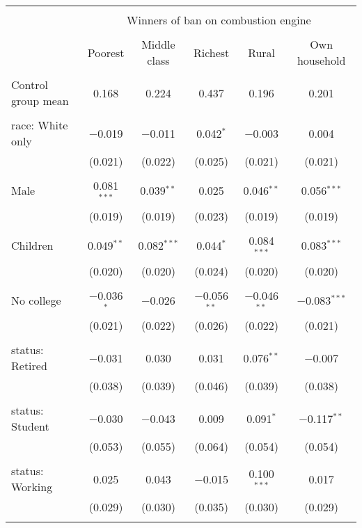 
\begin{tabular}{@{\extracolsep{5pt}}lccccc} 
\\[-1.8ex]\hline 
\hline \\[-1.8ex] 
 & \multicolumn{5}{c}{Winners of ban on combustion engine} \\ 
\cline{2-6} 
\\[-1.8ex] & Poorest & Middle class & Richest & Rural & Own household \\ 
\hline \\[-1.8ex] 
 Control group mean & 0.168 & 0.224 & 0.437 & 0.196 & 0.201  \\ \hline \\[-1.8ex] race: White only & $-$0.019 & $-$0.011 & 0.042$^{*}$ & $-$0.003 & 0.004 \\ 
  & (0.021) & (0.022) & (0.025) & (0.021) & (0.021) \\ 
  & & & & & \\ 
 Male & 0.081$^{***}$ & 0.039$^{**}$ & 0.025 & 0.046$^{**}$ & 0.056$^{***}$ \\ 
  & (0.019) & (0.019) & (0.023) & (0.019) & (0.019) \\ 
  & & & & & \\ 
 Children & 0.049$^{**}$ & 0.082$^{***}$ & 0.044$^{*}$ & 0.084$^{***}$ & 0.083$^{***}$ \\ 
  & (0.020) & (0.020) & (0.024) & (0.020) & (0.020) \\ 
  & & & & & \\ 
 No college & $-$0.036$^{*}$ & $-$0.026 & $-$0.056$^{**}$ & $-$0.046$^{**}$ & $-$0.083$^{***}$ \\ 
  & (0.021) & (0.022) & (0.026) & (0.022) & (0.021) \\ 
  & & & & & \\ 
 status: Retired & $-$0.031 & 0.030 & 0.031 & 0.076$^{**}$ & $-$0.007 \\ 
  & (0.038) & (0.039) & (0.046) & (0.039) & (0.038) \\ 
  & & & & & \\ 
 status: Student & $-$0.030 & $-$0.043 & 0.009 & 0.091$^{*}$ & $-$0.117$^{**}$ \\ 
  & (0.053) & (0.055) & (0.064) & (0.054) & (0.054) \\ 
  & & & & & \\ 
 status: Working & 0.025 & 0.043 & $-$0.015 & 0.100$^{***}$ & 0.017 \\ 
  & (0.029) & (0.030) & (0.035) & (0.030) & (0.029) \\ 
  & & & & & \\ 

\end{tabular}
